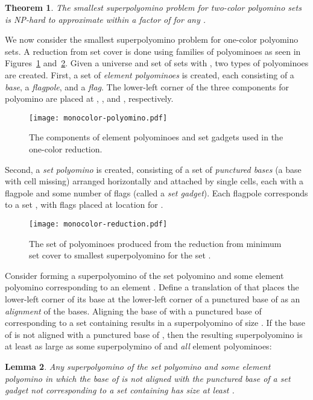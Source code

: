 \documentclass{article}
\newtheorem{theorem}{Theorem}[section]
\newtheorem{lemma}[theorem]{Lemma}
\newcommand{\ccNP}{\textrm{\textsc{NP}}}
\begin{document}
\begin{theorem}
The smallest superpolyomino problem for two-color polyomino sets is \ccNP-hard to approximate within a factor of  for any .
\end{theorem}

We now consider the smallest superpolyomino problem for one-color polyomino sets.
A reduction from set cover is done using families of polyominoes as seen in Figures~\ref{fig:monocolor-polyomino} and~\ref{fig:monocolor-reduction}.
Given a universe  and set of sets  with , two types of polyominoes are created.
First, a set of \emph{element polyominoes}  is created, each consisting of a  \emph{base}, a  \emph{flagpole}, and a  \emph{flag}.
The lower-left corner of the three components for polyomino  are placed at , , and , respectively. 

\begin{figure}[ht]
\centering
\texttt{[image: monocolor-polyomino.pdf]}
\caption{The components of element polyominoes and set gadgets used in the one-color reduction.}
\label{fig:monocolor-polyomino}
\end{figure}

Second, a \emph{set polyomino}  is created, consisting of a set of \emph{punctured bases} (a base with cell  missing) arranged horizontally and attached by single cells, each with a flagpole and some number of flags (called a \emph{set gadget}).
Each flagpole corresponds to a set , with flags placed at location  for .

\begin{figure}[ht]
\centering
\texttt{[image: monocolor-reduction.pdf]}
\caption{The set of polyominoes produced from the reduction from minimum set cover to smallest superpolyomino for the set .}
\label{fig:monocolor-reduction}
\end{figure}

Consider forming a superpolyomino of the set polyomino  and some element polyomino  corresponding to an element .
Define a translation of  that places the lower-left corner of its base at the lower-left corner of a punctured base of  as an \emph{alignment} of the bases.
Aligning the base of  with a punctured base of  corresponding to a set containing  results in a superpolyomino of size .
If the base of  is not aligned with a punctured base of , then the resulting superpolyomino is at least as large as some superpolymino of  and \emph{all} element polyominoes:

\begin{lemma}
\label{lem:no-align-has-big-cost}
Any superpolyomino of the set polyomino  and some element polyomino  in which the base of  is not aligned with the punctured base of a set gadget not corresponding to a set containing has size at least . 
\end{lemma}
\end{document}

